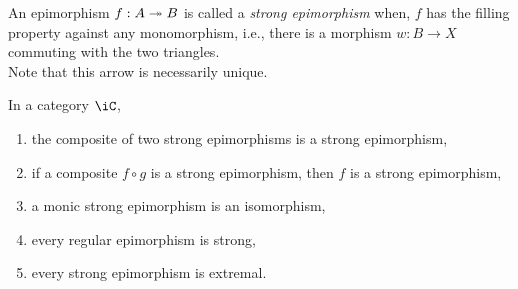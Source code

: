 \documentclass{amsart}
\begin{document}
\begin{defn}
  An epimorphism $f : A \twoheadrightarrow B$ is called a \emph{strong epimorphism} when, $f$ has the filling property against any monomorphism, i.e., there is a morphism $w : B \to X$ commuting with the two triangles.
  \[\]
  Note that this arrow is necessarily unique.
\end{defn}

\begin{prop}\label{prop:strong-epimorphism-facts}
  In a category $\iC$,
  \begin{enumerate}
  \item the composite of two strong epimorphisms is a strong epimorphism,
  \item if a composite $f \circ g$ is a strong epimorphism, then $f$ is a strong epimorphism,
  \item a monic strong epimorphism is an isomorphism,
  \item every regular epimorphism is strong,
  \item every strong epimorphism is extremal.
  \end{enumerate}
\end{prop}
\end{document}
